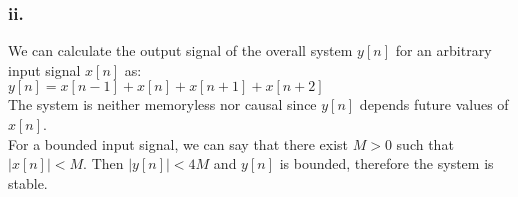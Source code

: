 \documentclass[12pt]{article}
\begin{document}
    \subsubsection*{ii.}
    We can calculate the output signal of the overall system \(y[n]\)
    for an arbitrary input signal \(x[n]\) as:\\
    \begin{math}
      y[n] = x[n-1] + x[n] + x[n+1] + x[n+2]
    \end{math}\\
    The system is neither memoryless nor causal since \(y[n]\)
    depends future values of \(x[n]\).\\
    For a bounded input signal, we can say that there exist \(M>0\) 
    such that \(\left\lvert x[n]\right\rvert < M \). Then \(\left\lvert y[n]\right\rvert  < 4M\) 
    and \(y[n]\) is bounded, therefore the system is stable.

    
\end{document}
